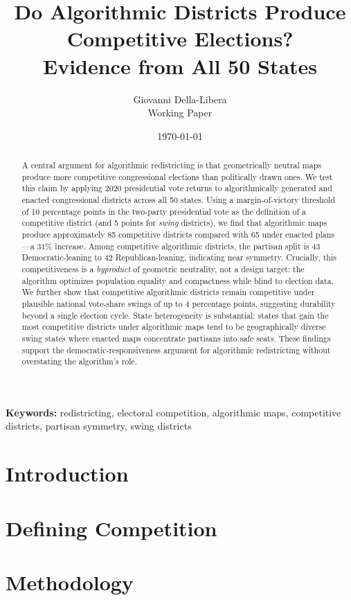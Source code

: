 \documentclass[12pt]{article}
\title{Do Algorithmic Districts Produce Competitive Elections?\\
Evidence from All 50 States}
\author{Giovanni Della-Libera\\
\small{Working Paper}}
\date{\today}
\begin{document}
\maketitle

\begin{abstract}
A central argument for algorithmic redistricting is that geometrically neutral
maps produce more competitive congressional elections than politically drawn
ones.  We test this claim by applying 2020 presidential vote returns to
algorithmically generated and enacted congressional districts across all
50 states.  Using a margin-of-victory threshold of 10 percentage points in the
two-party presidential vote as the definition of a competitive district
(and 5 points for \emph{swing} districts), we find that algorithmic maps
produce approximately 85 competitive districts compared with 65 under enacted
plans---a 31\% increase.  Among competitive algorithmic districts, the partisan
split is 43 Democratic-leaning to 42 Republican-leaning, indicating near
symmetry.  Crucially, this competitiveness is a \emph{byproduct} of geometric
neutrality, not a design target: the algorithm optimizes population equality
and compactness while blind to election data.  We further show that
competitive algorithmic districts remain competitive under plausible national
vote-share swings of up to 4 percentage points, suggesting durability beyond
a single election cycle.  State heterogeneity is substantial: states that gain
the most competitive districts under algorithmic maps tend to be geographically
diverse swing states where enacted maps concentrate partisans into safe seats.
These findings support the democratic-responsiveness argument for algorithmic
redistricting without overstating the algorithm's role.
\end{abstract}

\noindent\textbf{Keywords:} redistricting, electoral competition, algorithmic
maps, competitive districts, partisan symmetry, swing districts

\section{Introduction}


\section{Defining Competition}


\section{Methodology}

\end{document}

